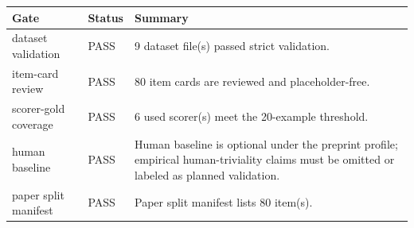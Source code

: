 \begin{tabularx}{\linewidth}{llX}
\toprule
Gate & Status & Summary \\
\midrule
dataset validation & PASS & 9 dataset file(s) passed strict validation. \\
item-card review & PASS & 80 item cards are reviewed and placeholder-free. \\
scorer-gold coverage & PASS & 6 used scorer(s) meet the 20-example threshold. \\
human baseline & PASS & Human baseline is optional under the preprint profile; empirical human-triviality claims must be omitted or labeled as planned validation. \\
paper split manifest & PASS & Paper split manifest lists 80 item(s). \\
\bottomrule
\end{tabularx}
